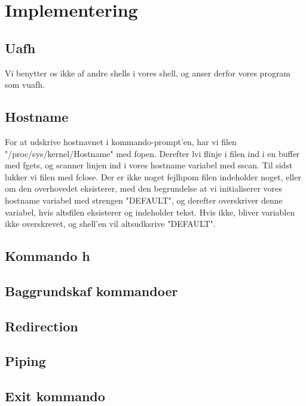 \section{Implementering}
\subsection{Uafh}


Vi benytter os ikke af andre shells i vores shell, og anser derfor vores program som v uafh. 

\subsection{Hostname}
For at udskrive hostnavnet i kommando-prompt'en, har vi  filen "/proc/sys/kernel/Hostname" med fopen. Derefter l vi f linje i filen ind i en buffer med fgets, og scanner linjen ind i vores hostname variabel med sscan. Til sidst lukker vi filen med fclose. Der er ikke noget fejlh p\å om filen indeholder noget, eller om den overhovedet eksisterer, med den begrundelse at vi initialiserer vores hostname variabel med strengen "DEFAULT", og derefter overskriver denne variabel, hvis alts\å filen eksisterer og indeholder tekst. Hvis ikke, bliver variablen ikke overskrevet, og shell'en vil alts\å udksrive "DEFAULT".

\subsection{Kommando h}

\subsection{Baggrundsk af kommandoer}

\subsection{Redirection}

\subsection{Piping}

\subsection{Exit kommando}
 
